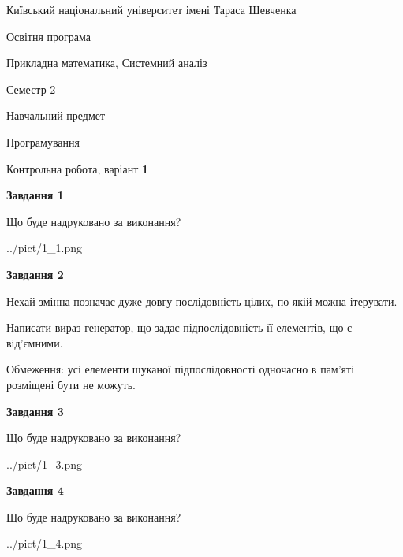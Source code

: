 \documentclass[12pt, ukrainian]{article}
\begin{document}
{{\begin {small}\par
{ \center  Київський національний університет імені Тараса Шевченка \par}
{\parbox {5 cm}{Освітня програма \hfill}{\parbox {8 cm}{Прикладна математика, Системний аналіз \hfill}}\parbox {5 cm}{\hfill Семестр 2}}\par
{\parbox {5 cm} {Навчальний предмет \hfill}\parbox {7 cm}{Програмування \hfill}\parbox {6cm}{\hfill}\par}\vspace{-7pt} \end{small}}{\center Контрольна робота, варіант  \No \textbf
{ 1 }\par}}
{
\begin {large}
{\begin {center}\textbf{Завдання 1}\end {center}}\par
Що буде надруковано за виконання?\par\par
\begin{center}
	{../pict/1_1.png}
\end{center}
\newpage

{\begin {center}\textbf{Завдання 2}\end {center}}\par
Нехай змінна  позначає дуже довгу послідовність цілих, по якій можна ітерувати.

Написати вираз-генератор, що задає підпослідовність її елементів, що є від'єм\-ни\-ми.

Обмеження: усі елементи шуканої підпослідовності одночасно в пам'яті розміщені бути не можуть.\par
\newpage

{\begin {center}\textbf{Завдання 3}\end {center}}\par
Що буде надруковано за виконання?\par
\begin{center}
	{../pict/1_3.png}
\end{center}
\newpage

{\begin {center}\textbf{Завдання 4}\end {center}}\par
Що буде надруковано за виконання?\par
\begin{center}
	{../pict/1_4.png}
\end{center}
\newpage


\end{large}}
\end{document}
